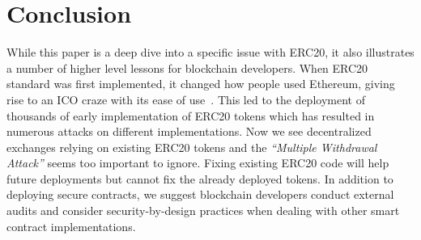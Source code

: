 
\section{Conclusion}

While this paper is a deep dive into a specific issue with ERC20, it also illustrates a number of higher level lessons for blockchain developers. When ERC20 standard was first implemented, it changed how people used Ethereum, giving rise to an ICO craze with its ease of use~\cite{fenu2018ico}. This led to the deployment of thousands of early implementation of ERC20 tokens which has resulted in numerous attacks on different implementations. Now we see decentralized exchanges relying on existing ERC20 tokens and the \textit{``Multiple Withdrawal Attack''} seems too important to ignore. Fixing existing ERC20 code will help future deployments but cannot fix the already deployed tokens. In addition to deploying secure contracts, we suggest blockchain developers conduct external audits and consider security-by-design practices when dealing with other smart contract implementations. 

